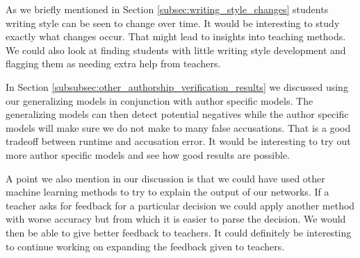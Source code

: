 As we briefly mentioned in Section \ref{subsec:writing_style_changes} students
writing style can be seen to change over time. It would be interesting to study
exactly what changes occur. That might lead to insights into teaching methods.
We could also look at finding students with little writing style development and
flagging them as needing extra help from teachers.

In Section \ref{subsubsec:other_authorship_verification_results} we discussed
using our generalizing models in conjunction with author specific models. The
generalizing models can then detect potential negatives while the author
specific models will make sure we do not make to many false accusations. That is
a good tradeoff between runtime and accusation error. It would be interesting to
try out more author specific models and see how good results are possible.

A point we also mention in our discussion is that we could have used other
machine learning methods to try to explain the output of our networks. If a
teacher asks for feedback for a particular decision we could apply another
method with worse accuracy but from which it is easier to parse the decision.
We would then be able to give better feedback to teachers. It could definitely
be interesting to continue working on expanding the feedback given to teachers.
